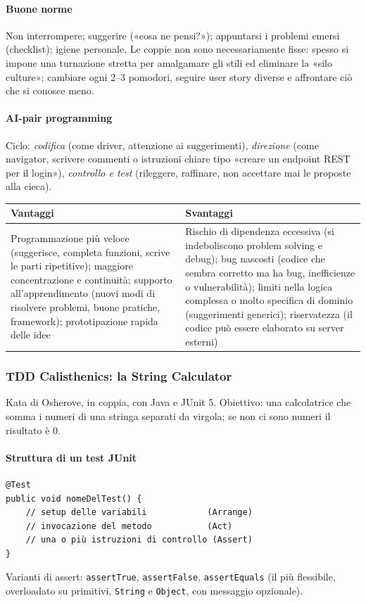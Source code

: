 \documentclass[a4paper,12pt]{article}
\begin{document}
\paragraph{Buone norme} Non interrompere; suggerire («cosa ne pensi?»); appuntarsi i
problemi emersi (checklist); igiene personale. Le coppie non sono necessariamente fisse:
spesso si impone una turnazione stretta per amalgamare gli stili ed eliminare la «silo
culture»; cambiare ogni 2--3 pomodori, seguire user story diverse e affrontare ciò che si
conosce meno.

\paragraph{AI-pair programming} Ciclo: \emph{codifica} (come driver, attenzione ai
suggerimenti), \emph{direzione} (come navigator, scrivere commenti o istruzioni chiare
tipo «creare un endpoint REST per il login»), \emph{controllo e test} (rileggere, raffinare,
non accettare mai le proposte alla cieca).
\begin{center}
\begin{tabular}{|p{7.2cm}|p{7.2cm}|}
\hline
\textbf{Vantaggi} & \textbf{Svantaggi}\\
\hline
Programmazione più veloce (suggerisce, completa funzioni, scrive le parti ripetitive);
maggiore concentrazione e continuità; supporto all'apprendimento (nuovi modi di risolvere
problemi, buone pratiche, framework); prototipazione rapida delle idee &
Rischio di dipendenza eccessiva (si indeboliscono problem solving e debug); bug nascosti
(codice che sembra corretto ma ha bug, inefficienze o vulnerabilità); limiti nella logica
complessa o molto specifica di dominio (suggerimenti generici); riservatezza (il codice
può essere elaborato su server esterni)\\
\hline
\end{tabular}
\end{center}

\subsubsection{TDD Calisthenics: la String Calculator}
Kata di Osherove, in coppia, con Java e JUnit 5. Obiettivo: una calcolatrice che somma i numeri di una
stringa separati da virgola; se non ci sono numeri il risultato è 0.

\paragraph{Struttura di un test JUnit}
\begin{verbatim}
@Test
public void nomeDelTest() {
    // setup delle variabili            (Arrange)
    // invocazione del metodo           (Act)
    // una o più istruzioni di controllo (Assert)
}
\end{verbatim}
Varianti di assert: \texttt{assertTrue}, \texttt{assertFalse}, \texttt{assertEquals} (il
più flessibile, overloadato su primitivi, \texttt{String} e \texttt{Object}, con messaggio
opzionale).
\end{document}
